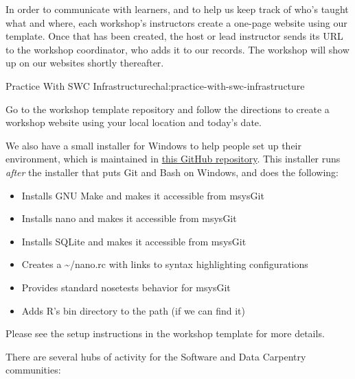 In order to communicate with learners, and to help us keep track of
who's taught what and where, each workshop's instructors create a
one-page website using our template. Once that has been created, the host or lead instructor sends
its URL to the workshop coordinator, who adds it to our records. The workshop will show up on
our websites shortly thereafter.

\begin{challenge}{Practice With SWC Infrastructure}{chal:practice-with-swc-infrastructure}

Go to the workshop template repository and follow the directions to create a workshop website using
your local location and today's date.
\end{challenge}

We also have
a small installer for Windows to help people set up their environment,
which is maintained in
\href{https://github.com/swcarpentry/windows-installer}{this GitHub
repository}. This installer runs \emph{after} the installer that puts
Git and Bash on Windows, and does the following:

\begin{itemize}
\item
  Installs GNU Make and makes it accessible from msysGit
\item
  Installs nano and makes it accessible from msysGit
\item
  Installs SQLite and makes it accessible from msysGit
\item
  Creates a \textasciitilde{}/nano.rc with links to syntax highlighting
  configurations
\item
  Provides standard nosetests behavior for msysGit
\item
  Adds R's bin directory to the path (if we can find it)
\end{itemize}

Please see the setup instructions in the workshop template for more
details.


There are several hubs of activity for the Software and Data Carpentry
communities:

